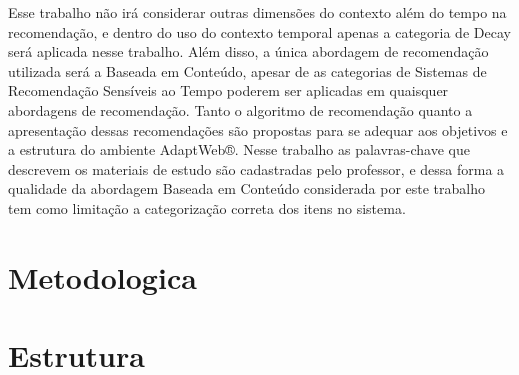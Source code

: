 Esse trabalho não irá considerar outras dimensões do contexto além do tempo na recomendação, e dentro do uso do contexto
temporal apenas a categoria de Decay será aplicada nesse trabalho. Além disso, a única abordagem de recomendação
utilizada será a Baseada em Conteúdo, apesar de as categorias de Sistemas de Recomendação Sensíveis ao Tempo poderem ser
aplicadas em quaisquer abordagens de recomendação. Tanto o algoritmo de recomendação quanto a apresentação dessas
recomendações são propostas para se adequar aos objetivos e a estrutura do ambiente AdaptWeb®. Nesse trabalho as
palavras-chave que descrevem os materiais de estudo são cadastradas pelo professor, e dessa forma a qualidade da
abordagem Baseada em Conteúdo considerada por este trabalho tem como limitação a categorização correta dos itens no
sistema.

\section{Metodologica}

\section{Estrutura}



